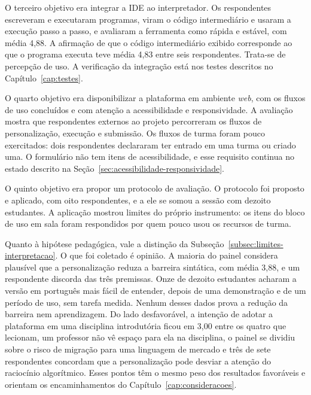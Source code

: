 O terceiro objetivo era integrar a IDE ao interpretador. Os respondentes escreveram e executaram programas, viram o código intermediário e usaram a execução passo a passo, e avaliaram a ferramenta como rápida e estável, com média 4,88. A afirmação de que o código intermediário exibido corresponde ao que o programa executa teve média 4,83 entre seis respondentes. Trata-se de percepção de uso. A verificação da integração está nos testes descritos no Capítulo~\ref{cap:testes}.

O quarto objetivo era disponibilizar a plataforma em ambiente \textit{web}, com os fluxos de uso concluídos e com atenção a acessibilidade e responsividade. A avaliação mostra que respondentes externos ao projeto percorreram os fluxos de personalização, execução e submissão. Os fluxos de turma foram pouco exercitados: dois respondentes declararam ter entrado em uma turma ou criado uma. O formulário não tem itens de acessibilidade, e esse requisito continua no estado descrito na Seção~\ref{sec:acessibilidade-responsividade}.

O quinto objetivo era propor um protocolo de avaliação. O protocolo foi proposto e aplicado, com oito respondentes, e a ele se somou a sessão com dezoito estudantes. A aplicação mostrou limites do próprio instrumento: os itens do bloco de uso em sala foram respondidos por quem pouco usou os recursos de turma.

Quanto à hipótese pedagógica, vale a distinção da Subseção~\ref{subsec:limites-interpretacao}. O que foi coletado é opinião. A maioria do painel considera plausível que a personalização reduza a barreira sintática, com média 3,88, e um respondente discorda das três premissas. Onze de dezoito estudantes acharam a versão em português mais fácil de entender, depois de uma demonstração e de um período de uso, sem tarefa medida. Nenhum desses dados prova a redução da barreira nem aprendizagem. Do lado desfavorável, a intenção de adotar a plataforma em uma disciplina introdutória ficou em 3,00 entre os quatro que lecionam, um professor não vê espaço para ela na disciplina, o painel se dividiu sobre o risco de migração para uma linguagem de mercado e três de sete respondentes concordam que a personalização pode desviar a atenção do raciocínio algorítmico. Esses pontos têm o mesmo peso dos resultados favoráveis e orientam os encaminhamentos do Capítulo~\ref{cap:consideracoes}.
